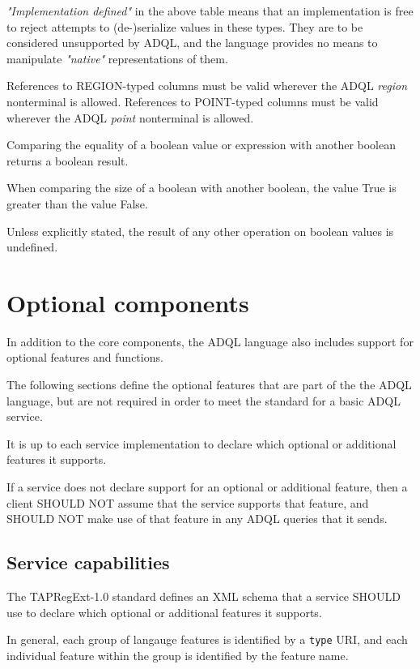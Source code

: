 \documentclass[11pt,a4paper]{ivoa}
\begin{document}
\textit{"Implementation defined"} in the above table means that an
implementation is free to reject attempts to (de-)serialize values in
these types.
They are to be considered unsupported by ADQL, and the language provides
no means to manipulate \textit{"native"} representations of them.

References to REGION-typed columns must be valid wherever the ADQL
\textit{region} nonterminal is allowed. References to POINT-typed columns
must be valid wherever the ADQL \textit{point} nonterminal is allowed.

Comparing the equality of a boolean value or expression with another
boolean returns a boolean result.

When comparing the size of a boolean with another boolean, the value
True is greater than the value False.

Unless explicitly stated, the result of any other operation on boolean
values is undefined.

\clearpage
\section{Optional components}
\label{sec:optional}

In addition to the core components, the ADQL language also includes support
for optional features and functions.

The following sections define the optional features that are part of the
the ADQL language, but are not required in order to meet the standard for
a basic ADQL service.

It is up to each service implementation to declare which optional or
additional features it supports.

If a service does not declare support for an optional or additional feature,
then a client SHOULD NOT assume that the service supports that feature,
and SHOULD NOT make use of that feature in any ADQL queries that it sends.

\subsection{Service capabilities}
\label{sec:capabilities}

The TAPRegExt-1.0 standard \citep{std:TAPREGEXT} defines an XML schema that a service SHOULD
use to declare which optional or additional features it supports.

In general, each group of langauge features is identified by a \verb:type:
URI, and each individual feature within the group is identified by the
feature name.
\end{document}
